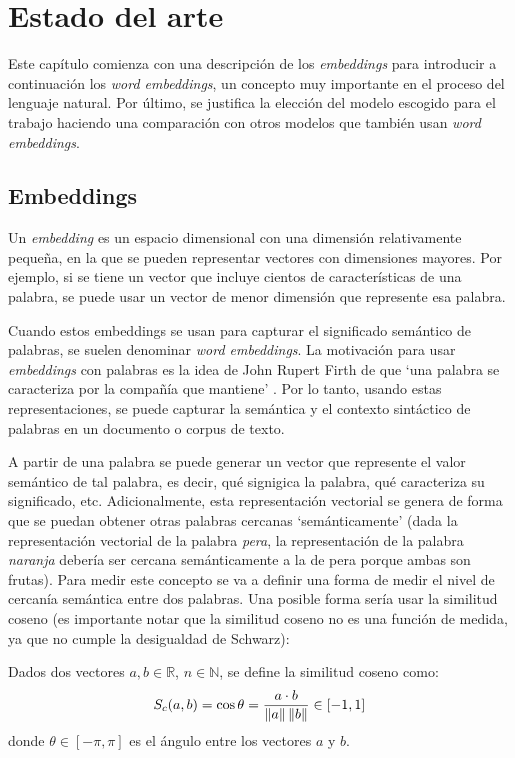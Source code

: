 \chapter{Estado del arte}

Este capítulo comienza con una descripción de los \textit{embeddings} para introducir a
continuación los \textit{word embeddings}, un concepto muy importante en el proceso del lenguaje natural. Por
último, se justifica la elección del modelo escogido para el trabajo haciendo una comparación con
otros modelos que también usan \textit{word embeddings}.

\section{Embeddings}

Un \textit{embedding} es un espacio dimensional con una dimensión relativamente pequeña, en la que se pueden
representar vectores con dimensiones mayores. Por ejemplo, si se tiene un vector que incluye cientos de características
de una palabra, se puede usar un vector de menor dimensión que represente esa palabra.

Cuando estos embeddings se usan para capturar el significado semántico de palabras, se suelen denominar
\textit{word embeddings}. La motivación para usar \textit{embeddings} con palabras es la idea de John Rupert
Firth de que `una palabra se caracteriza por la compañía que mantiene' \cite{firth1957synopsis}. Por lo tanto,
usando estas representaciones, se puede capturar la semántica y el contexto sintáctico de palabras en un documento
o corpus de texto.

A partir de una palabra se puede generar un vector que represente el valor semántico de tal palabra, es decir, qué signigica la palabra, qué caracteriza
su significado, etc. Adicionalmente, esta representación vectorial se genera de forma que se puedan obtener otras palabras
cercanas `semánticamente' (dada la representación vectorial de la palabra \textit{pera}, la representación de la palabra \textit{naranja}
debería ser cercana semánticamente a la de pera porque ambas son frutas). Para medir este concepto se va a definir una forma de medir el nivel
de cercanía semántica entre dos palabras. Una posible forma sería usar la similitud coseno (es importante notar que la similitud coseno no es una función de medida,
ya que no cumple la desigualdad de Schwarz):

\begin{definition}
  Dados dos vectores $a,b\in\mathbb{R}$, $n\in\mathbb{N}$, se define la similitud coseno como:
  \[
    S_c(a,b)=\cos\theta = \frac{a\cdot b}{\left\lVert a\right\rVert\left\lVert b\right\rVert} \in [-1, 1]
  \]
donde $\theta\in[-\pi,\pi]$ es el ángulo entre los vectores $a$ y $b$.
\end{definition}

